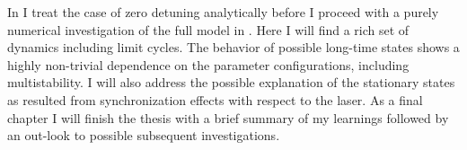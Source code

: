 In  I treat the case of zero detuning analytically before I proceed with a purely numerical investigation of the full model in . Here I will find a rich set of dynamics including limit cycles. The behavior of possible long-time states shows a highly non-trivial dependence on the parameter configurations, including multistability. I will also address the possible explanation of the stationary states as resulted from synchronization effects with respect to the laser. As a final chapter I will finish the thesis with a brief summary of my learnings followed by an out-look to possible subsequent investigations.\newpage
